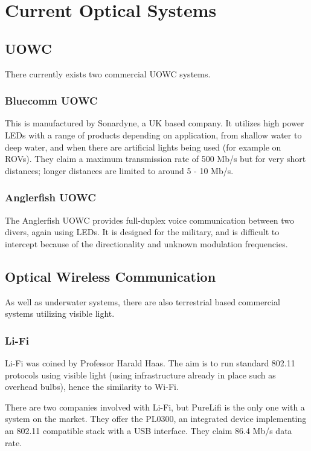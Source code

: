 \section{Current Optical Systems}
\subsection{\ac{UOWC}}
There currently exists two commercial \ac{UOWC} systems.

\subsubsection{Bluecomm \ac{UOWC}}
This is manufactured by Sonardyne, a UK based company. It utilizes high power
\ac{LED}s with a range of products depending on application, from shallow water
to deep water, and when there are artificial lights being used (for example on
\ac{ROV}s). They claim a maximum transmission rate of 500 Mb/s but for very
short distances; longer distances are limited to around 5 - 10 Mb/s.

\subsubsection{Anglerfish \ac{UOWC}}
The Anglerfish \ac{UOWC} provides full-duplex voice communication between two
divers, again using \ac{LED}s. It is designed for the military, and is
difficult to intercept because of the directionality and unknown modulation
frequencies.

\subsection{Optical Wireless Communication}
As well as underwater systems, there are also terrestrial based commercial
systems utilizing visible light.

\subsubsection{Li-Fi}
Li-Fi was coined by Professor Harald Haas. The aim is to run standard 802.11
protocols using visible light (using infrastructure already in place such as
overhead bulbs), hence the similarity to Wi-Fi.

There are two companies involved with Li-Fi, but PureLifi is the only one with
a system on the market. They offer the PL0300, an integrated device
implementing an 802.11 compatible stack with a USB interface. They claim
86.4 Mb/s data rate.


